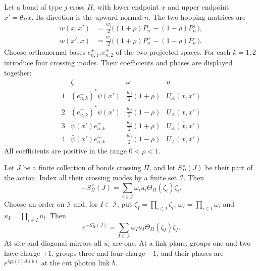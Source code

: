 \documentclass[11pt,letterpaper,reqno]{amsart}
\begin{document}
Let a bond of type $j$ cross $\Pi$, with lower endpoint $x$ and upper
endpoint $x'=\theta_\Pi x$. Its direction is the upward normal $n$.
The two hopping matrices are
\begin{equation}\label{eq:reg-crossing-projectors}
 \begin{split}
 w(x,x')&=\tfrac{w_j}{2}\bigl((1+\rho)P_n^--(1-\rho)P_n^+\bigr),\\
 w(x',x)&=\tfrac{w_j}{2}\bigl((1+\rho)P_n^+-(1-\rho)P_n^-\bigr).
 \end{split}
\end{equation}
Choose orthonormal bases $e_{n,1}^\pm,e_{n,2}^\pm$ of the two
projected spaces. For each $k=1,2$ introduce four crossing modes.
Their coefficients and phases are displayed together:
\begin{equation}\label{eq:reg-crossing-modes}
\begin{array}{c|c|c|c}
 &\zeta&\omega&u\\ \hline
 1&(e_{n,k}^-)^*\psi(x')&\tfrac{w_j}{2}(1+\rho)&U_A(x,x')\\
 2&(e_{n,k}^+)^*\psi(x')&\tfrac{w_j}{2}(1-\rho)&U_A(x,x')\\
 3&\bar\psi(x')e_{n,k}^+&\tfrac{w_j}{2}(1+\rho)&\overline{U_A(x,x')}\\
 4&\bar\psi(x')e_{n,k}^-&\tfrac{w_j}{2}(1-\rho)&\overline{U_A(x,x')}
\end{array}
\end{equation}
All coefficients are positive in the range $0<\rho<1$.

\begin{proposition}\label{prop:reg-crossing-expansion}
Let $J$ be a finite collection of bonds crossing $\Pi$, and let
$S_\Pi^\times(J)$ be their part of the action. Index all their crossing
modes by a finite set $\mathcal I$. Then
\begin{equation}\label{eq:reg-crossing-positive}
 -S_\Pi^\times(J)=\sum_{i\in\mathcal I}\omega_i u_i\Theta_\Pi(\zeta_i)\zeta_i.
\end{equation}
Choose an order on $\mathcal I$ and, for $I\subset\mathcal I$, put
$\zeta_I=\prod_{i\in I}\zeta_i$, $\omega_I=\prod_{i\in I}\omega_i$
and $u_I=\prod_{i\in I}u_i$. Then
\begin{equation}\label{eq:reg-crossing-exponential}
 e^{-S_\Pi^\times(J)}=\sum_{I\subset\mathcal I}\omega_Iu_I\Theta_\Pi(\zeta_I)\zeta_I.
\end{equation}
At site and diagonal mirrors all $u_i$ are one. At a link plane,
groups one and two have charge $+1$, groups three and four charge
$-1$, and their phases are $e^{iq\mathfrak q(i)A(b)}$ at the cut
photon link $b$.
\end{proposition}
\end{document}
